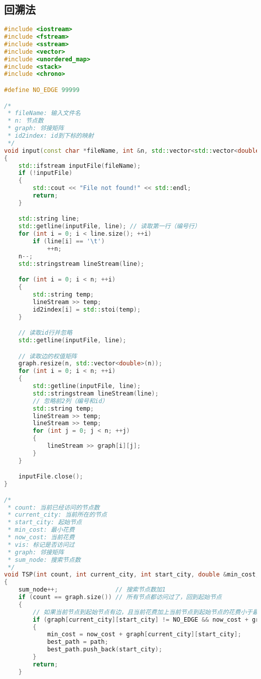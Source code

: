 \documentclass[lang=cn,11pt,a4paper]{elegantpaper}
\begin{document}
\subsection{回溯法}
\begin{lstlisting}[language=c++]
#include <iostream>
#include <fstream>
#include <sstream>
#include <vector>
#include <unordered_map>
#include <stack>
#include <chrono>

#define NO_EDGE 99999

/*
 * fileName: 输入文件名
 * n: 节点数
 * graph: 邻接矩阵
 * id2index: id到下标的映射
 */
void input(const char *fileName, int &n, std::vector<std::vector<double>> &graph, std::unordered_map<int, int> &id2index)
{
    std::ifstream inputFile(fileName);
    if (!inputFile)
    {
        std::cout << "File not found!" << std::endl;
        return;
    }

    std::string line;
    std::getline(inputFile, line); // 读取第一行（编号行）
    for (int i = 0; i < line.size(); ++i)
        if (line[i] == '\t')
            ++n;
    n--;
    std::stringstream lineStream(line);

    for (int i = 0; i < n; ++i)
    {
        std::string temp;
        lineStream >> temp;
        id2index[i] = std::stoi(temp);
    }

    // 读取id行并忽略
    std::getline(inputFile, line);

    // 读取边的权值矩阵
    graph.resize(n, std::vector<double>(n));
    for (int i = 0; i < n; ++i)
    {
        std::getline(inputFile, line);
        std::stringstream lineStream(line);
        // 忽略前2列（编号和id）
        std::string temp;
        lineStream >> temp;
        lineStream >> temp;
        for (int j = 0; j < n; ++j)
        {
            lineStream >> graph[i][j];
        }
    }

    inputFile.close();
}

/*
 * count: 当前已经访问的节点数
 * current_city: 当前所在的节点
 * start_city: 起始节点
 * min_cost: 最小花费
 * now_cost: 当前花费
 * vis: 标记是否访问过
 * graph: 邻接矩阵
 * sum_node: 搜索节点数
 */
void TSP(int count, int current_city, int start_city, double &min_cost, double now_cost, std::vector<int> &best_path, std::vector<int> &path, std::vector<bool> &vis, std::vector<std::vector<double>> &graph, long long &sum_node)
{
    sum_node++;                // 搜索节点数加1
    if (count == graph.size()) // 所有节点都访问过了，回到起始节点
    {
        // 如果当前节点到起始节点有边，且当前花费加上当前节点到起始节点的花费小于最小花费
        if (graph[current_city][start_city] != NO_EDGE && now_cost + graph[current_city][start_city] < min_cost)
        {
            min_cost = now_cost + graph[current_city][start_city];
            best_path = path;
            best_path.push_back(start_city);
        }
        return;
    }


\end{lstlisting}
\end{document}

